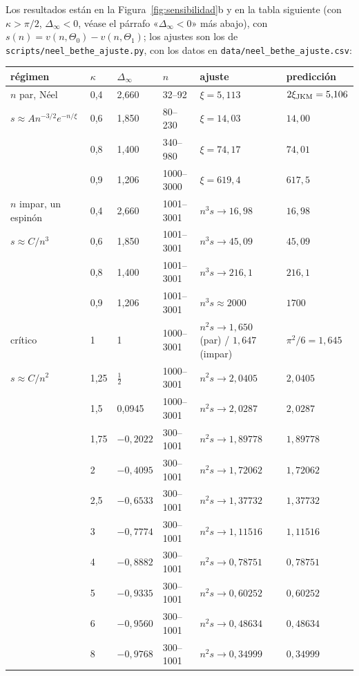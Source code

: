 \documentclass[11pt,a4paper]{article}
\theoremstyle{remark}
\begin{document}
Los resultados están en la Figura~\ref{fig:sensibilidad}b y en la tabla siguiente (con
$\kappa>\pi/2$, $\Delta_\infty<0$, véase el párrafo «$\Delta_\infty<0$» más abajo), con
$s(n)=v(n,\Theta_0)-v(n,\Theta_1)$; los ajustes son los de
\texttt{scripts/neel\_bethe\_ajuste.py}, con los datos en \texttt{data/neel\_bethe\_ajuste.csv}:
\begin{center}\small
\begin{tabular}{llllll}
\toprule
régimen & $\kappa$ & $\Delta_\infty$ & $n$ & ajuste & predicción\\
\midrule
$n$ par, Néel & 0,4 & 2,660 & 32--92 & $\xi=5{,}113$ & $2\xi_{\rm JKM}=5{,}106$\\
$s\approx An^{-3/2}e^{-n/\xi}$ & 0,6 & 1,850 & 80--230 & $\xi=14{,}03$ & $14{,}00$\\
& 0,8 & 1,400 & 340--980 & $\xi=74{,}17$ & $74{,}01$\\
& 0,9 & 1,206 & 1000--3000 & $\xi=619{,}4$ & $617{,}5$\\
\midrule
$n$ impar, un espinón & 0,4 & 2,660 & 1001--3001 & $n^3s\to16{,}98$ & $16{,}98$\\
$s\approx C/n^3$ & 0,6 & 1,850 & 1001--3001 & $n^3s\to45{,}09$ & $45{,}09$\\
& 0,8 & 1,400 & 1001--3001 & $n^3s\to216{,}1$ & $216{,}1$\\
& 0,9 & 1,206 & 1001--3001 & $n^3s\approx2000$ & $1700$\\
\midrule
crítico & 1 & 1 & 1000--3001 & $n^2s\to1{,}650$ (par) / $1{,}647$ (impar) & $\pi^2/6=1{,}645$\\
$s\approx C/n^2$ & 1,25 & $\tfrac12$ & 1000--3001 & $n^2s\to2{,}0405$ & $2{,}0405$\\
& 1,5 & 0,0945 & 1000--3001 & $n^2s\to2{,}0287$ & $2{,}0287$\\
& 1,75 & $-0{,}2022$ & 300--1001 & $n^2s\to1{,}89778$ & $1{,}89778$\\
& 2 & $-0{,}4095$ & 300--1001 & $n^2s\to1{,}72062$ & $1{,}72062$\\
& 2,5 & $-0{,}6533$ & 300--1001 & $n^2s\to1{,}37732$ & $1{,}37732$\\
& 3 & $-0{,}7774$ & 300--1001 & $n^2s\to1{,}11516$ & $1{,}11516$\\
& 4 & $-0{,}8882$ & 300--1001 & $n^2s\to0{,}78751$ & $0{,}78751$\\
& 5 & $-0{,}9335$ & 300--1001 & $n^2s\to0{,}60252$ & $0{,}60252$\\
& 6 & $-0{,}9560$ & 300--1001 & $n^2s\to0{,}48634$ & $0{,}48634$\\
& 8 & $-0{,}9768$ & 300--1001 & $n^2s\to0{,}34999$ & $0{,}34999$\\
\bottomrule
\end{tabular}
\end{center}
\end{document}
